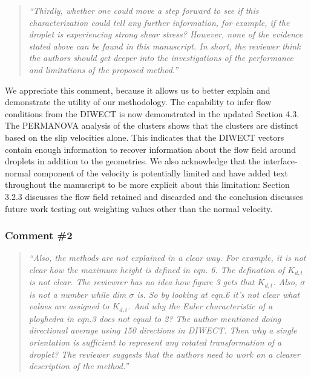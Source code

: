 \documentclass[11pt]{article}
\begin{document}
\begin{quote}
    {\it ``Thirdly, whether one could move a step forward to see if this characterization could tell any further information, for example, if the droplet is experiencing strong shear stress? However, none of the evidence stated above can be found in this manuscript. In short, the reviewer think the authors should get deeper into the investigations of the performance and limitations of the proposed method.''}
\end{quote}

We appreciate this comment, because it allows us to better explain and demonstrate the utility of our methodology. The capability to infer flow conditions from the DIWECT is now demonstrated in the updated Section 4.3. The PERMANOVA analysis of the clusters shows that the clusters are distinct based on the slip velocities alone. This indicates that the DIWECT vectors contain enough information to recover information about the flow field around droplets in addition to the geometries. We also acknowledge that the interface-normal component of the velocity is potentially limited and have added text throughout the manuscript to be more explicit about this limitation: Section 3.2.3 discusses the flow field retained and discarded and the conclusion discusses future work testing out weighting values other than the normal velocity.

\subsubsection*{Comment \#2}
\begin{quote}
{\it``Also, the methods are not explained in a clear way. For example, it is not clear how the maximum height is defined in eqn. 6. The defination of $K_{d,t}$ is not clear. The reviewrer has no idea how figure 3 gets that $K_{d,t}$. Also, $\sigma$ is not a number while dim $\sigma$ is. So by looking at eqn.6 it's not clear what values are assigned to $K_{d,t}$. And why the Euler characteristic of a ployhedra in eqn.3 does not equal to 2? The author mentioned doing directional average using 150 directions in DIWECT. Then why a single orientation is sufficient to represent any rotated transformation of a droplet? The reviewer suggests that the authors need to work on a clearer description of the method.''}
\end{quote}
\end{document}
